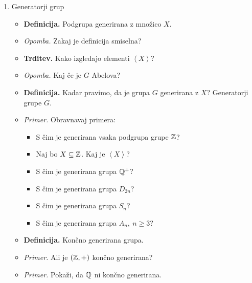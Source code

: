 \begin{enumerate}
    \item Generatorji grup
    \begin{itemize}
        \item \colorbox{purple!30}{\textbf{Definicija.}} Podgrupa generirana z množico $X$.        
        \item \colorbox{yellow!30}{\emph{Opomba.}} Zakaj je definicija smiselna?
        \item \colorbox{blue!30}{\textbf{Trditev.}} Kako izgledajo elementi $\left\langle X \right\rangle$?   
        \item \colorbox{yellow!30}{\emph{Opomba.}} Kaj če je $G$ Abelova?
        \item \colorbox{purple!30}{\textbf{Definicija.}} Kadar pravimo, da je grupa $G$ generirana z $X$? Generatorji grupe $G$.   
        \item \colorbox{yellow!30}{\emph{Primer.}} Obravnavaj primera:
        \begin{itemize}
            \item S čim je generirana vsaka podgrupa grupe $\mathbb{Z}$?
            \item Naj bo $X \subseteq \mathbb{Z}$. Kaj je $\left\langle X \right\rangle $?
            \item S čim je generirana grupa $\mathbb{Q}^+$?
            \item S čim je generirana grupa $D_{2n}$?
            \item S čim je generirana grupa $S_n$?
            \item S čim je generirana grupa $A_n, \ n \geq 3$?
        \end{itemize}
        \item \colorbox{purple!30}{\textbf{Definicija.}} Končno generirana grupa.      
        \item \colorbox{yellow!30}{\emph{Primer.}} Ali je $(\mathbb{Z}, +)$ končno generirana?        
        \item \colorbox{yellow!30}{\emph{Primer.}} Pokaži, da $\mathbb{Q}$ ni končno generirana.
    \end{itemize}
\end{enumerate}

\newpage
